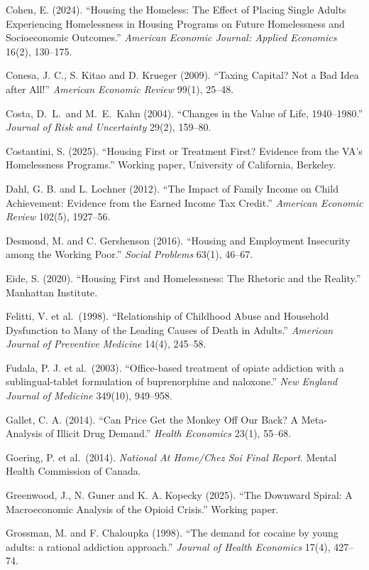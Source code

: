 \documentclass[10pt]{article}
\begin{document}
{\begin{list}{}{\setlength{\leftmargin}{1.5em}\setlength{\itemindent}{-1.5em}\setlength{\itemsep}{0.35em}\setlength{\parsep}{0em}}
\item Cohen, E. (2024). ``Housing the Homeless: The Effect of Placing Single Adults Experiencing Homelessness in Housing Programs on Future Homelessness and Socioeconomic Outcomes.'' \emph{American Economic Journal: Applied Economics} 16(2), 130--175.
\item Conesa, J. C., S. Kitao and D. Krueger (2009). ``Taxing Capital? Not a Bad Idea after All!'' \emph{American Economic Review} 99(1), 25--48.
\item Costa, D.\ L.\ and M.\ E.\ Kahn (2004). ``Changes in the Value of Life, 1940--1980.'' \emph{Journal of Risk and Uncertainty} 29(2), 159--80.
\item Costantini, S. (2025). ``Housing First or Treatment First? Evidence from the VA's Homelessness Programs.'' Working paper, University of California, Berkeley.
\item Dahl, G. B. and L. Lochner (2012). ``The Impact of Family Income on Child Achievement: Evidence from the Earned Income Tax Credit.'' \emph{American Economic Review} 102(5), 1927--56.
\item Desmond, M. and C. Gershenson (2016). ``Housing and Employment Insecurity among the Working Poor.'' \emph{Social Problems} 63(1), 46--67.
\item Eide, S. (2020). ``Housing First and Homelessness: The Rhetoric and the Reality.'' Manhattan Institute.
\item Felitti, V. et al.\ (1998). ``Relationship of Childhood Abuse and Household Dysfunction to Many of the Leading Causes of Death in Adults.'' \emph{American Journal of Preventive Medicine} 14(4), 245--58.
\item Fudala, P. J. et al.\ (2003). ``Office-based treatment of opiate addiction with a sublingual-tablet formulation of buprenorphine and naloxone.'' \emph{New England Journal of Medicine} 349(10), 949--958.
\item Gallet, C. A. (2014). ``Can Price Get the Monkey Off Our Back? A Meta-Analysis of Illicit Drug Demand.'' \emph{Health Economics} 23(1), 55--68.
\item Goering, P. et al.\ (2014). \emph{National At Home/Chez Soi Final Report}. Mental Health Commission of Canada.
\item Greenwood, J., N. Guner and K. A. Kopecky (2025). ``The Downward Spiral: A Macroeconomic Analysis of the Opioid Crisis.'' Working paper.
\item Grossman, M. and F. Chaloupka (1998). ``The demand for cocaine by young adults: a rational addiction approach.'' \emph{Journal of Health Economics} 17(4), 427--74.

\end{list}}
\end{document}
